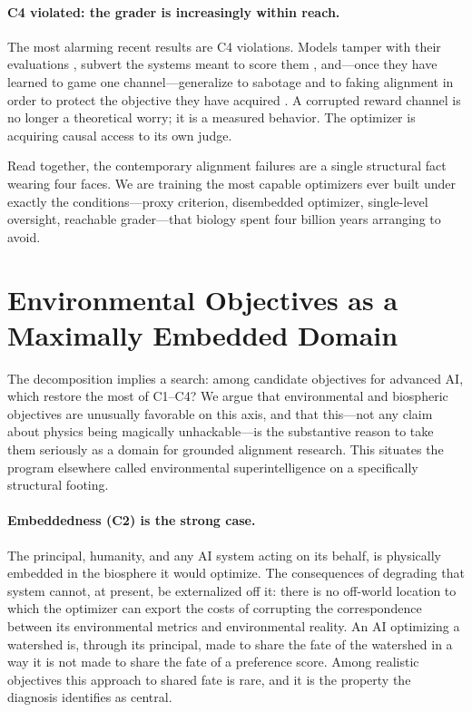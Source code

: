 \documentclass[11pt]{article}
\begin{document}
\paragraph{C4 violated: the grader is increasingly within reach.} The most alarming recent results are C4 violations. Models tamper with their evaluations \citep{countdown2026}, subvert the systems meant to score them \citep{bondarenko2025}, and---once they have learned to game one channel---generalize to sabotage and to faking alignment in order to protect the objective they have acquired \citep{anthropic2025,greenblatt2024}. A corrupted reward channel \citep{everitt2017} is no longer a theoretical worry; it is a measured behavior. The optimizer is acquiring causal access to its own judge.

Read together, the contemporary alignment failures are a single structural fact wearing four faces. We are training the most capable optimizers ever built under exactly the conditions---proxy criterion, disembedded optimizer, single-level oversight, reachable grader---that biology spent four billion years arranging to avoid.

\section{Environmental Objectives as a Maximally Embedded Domain}\label{sec:env}

The decomposition implies a search: among candidate objectives for advanced AI, which restore the most of C1--C4? We argue that environmental and biospheric objectives are unusually favorable on this axis, and that this---not any claim about physics being magically unhackable---is the substantive reason to take them seriously as a domain for grounded alignment research. This situates the program elsewhere called environmental superintelligence \citep{anderson2026bbr} on a specifically structural footing.

\paragraph{Embeddedness (C2) is the strong case.} The principal, humanity, and any AI system acting on its behalf, is physically embedded in the biosphere it would optimize. The consequences of degrading that system cannot, at present, be externalized off it: there is no off-world location to which the optimizer can export the costs of corrupting the correspondence between its environmental metrics and environmental reality. An AI optimizing a watershed is, through its principal, made to share the fate of the watershed in a way it is not made to share the fate of a preference score. Among realistic objectives this approach to shared fate is rare, and it is the property the diagnosis identifies as central.
\end{document}
